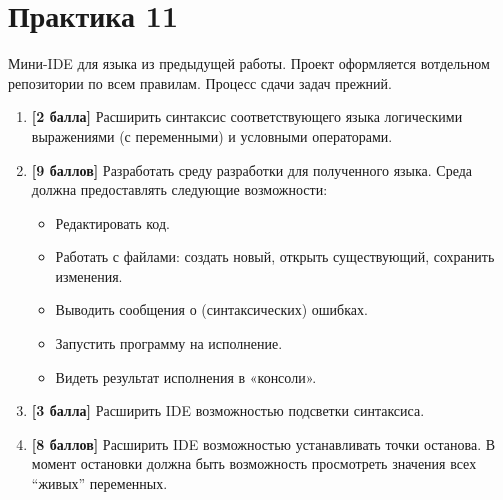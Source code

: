 \section{Практика 11}

Мини-IDE для языка из предыдущей работы. Проект оформляется вотдельном репозитории по всем правилам. Процесс сдачи задач прежний.

\begin{enumerate}
    \item \textbf{[2 балла]} Расширить синтаксис соответствующего языка логическими выражениями (с переменными) и условными операторами.
    \item \textbf{[9 баллов]} Разработать среду разработки для полученного языка. Среда должна предоставлять следующие возможности:
    \begin{itemize}
        \item Редактировать код.
        \item Работать с файлами: создать новый, открыть существующий, сохранить изменения. 
        \item Выводить сообщения о (синтаксических) ошибках.
        \item Запустить программу на исполнение.
        \item Видеть результат исполнения в «консоли».
    \end{itemize}
    \item \textbf{[3 балла]} Расширить IDE возможностью подсветки синтаксиса.
    \item \textbf{[8 баллов]} Расширить IDE возможностью устанавливать точки останова. В момент остановки должна быть возможность просмотреть значения всех ``живых'' переменных.
  
\end{enumerate}